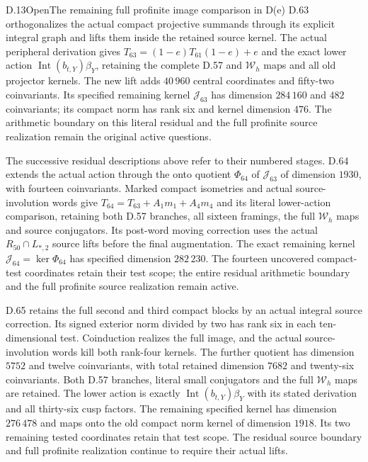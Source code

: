 \begin{statement}{D.13}{Open}{The remaining full profinite image comparison in D(e)}
D.63 orthogonalizes the actual compact projective summands
through its explicit integral graph and lifts them inside the
retained source kernel. The actual peripheral derivation gives
$T_{63}=(1-e)T_{61}(1-e)+e$ and the exact lower action
$\operatorname{Int}(b_{t,Y})\beta_Y$, retaining the complete
D.57 and $\mathcal W_h$ maps and all old projector kernels.
The new lift adds $40\,960$ central coordinates and fifty-two
coinvariants. Its specified remaining kernel $\mathcal J_{63}$
has dimension $284\,160$ and $482$ coinvariants; its compact
norm has rank six and kernel dimension $476$.
The arithmetic boundary on this literal residual and the
full profinite source realization remain the original active
questions.

The successive residual descriptions above refer to their
numbered stages. D.64 extends the actual action through the
onto quotient $\Phi_{64}$ of $\mathcal J_{63}$ of dimension
$1930$, with fourteen coinvariants. Marked compact isometries
and actual source-involution words give
$T_{64}=T_{63}+A_1m_1+A_4m_4$ and its literal lower-action
comparison, retaining both D.57 branches, all sixteen framings,
the full $\mathcal W_h$ maps and source conjugators.
Its post-word moving correction uses the actual
$R_{50}\cap L_{*,2}$ source lifts before the final augmentation.
The exact remaining kernel $\mathcal J_{64}=\ker\Phi_{64}$
has specified dimension $282\,230$.
The fourteen uncovered compact-test coordinates retain
their test scope; the entire residual arithmetic boundary
and the full profinite source realization remain active.

D.65 retains the full second and third compact blocks by an actual
integral source correction. Its signed exterior norm divided by two
has rank six in each ten-dimensional test. Coinduction realizes the
full image, and the actual source-involution words kill both rank-four
kernels. The further quotient has dimension $5752$ and twelve
coinvariants, with total retained dimension $7682$ and twenty-six
coinvariants. Both D.57 branches, literal small conjugators and the
full $\mathcal W_h$ maps are retained. The lower action is exactly
$\operatorname{Int}(b_{t,Y})\beta_Y$ with its stated derivation and
all thirty-six cusp factors. The remaining specified kernel has
dimension $276\,478$ and maps onto the old compact norm kernel of
dimension $1918$. Its two remaining tested coordinates retain that
test scope. The residual source boundary and full profinite
realization continue to require their actual lifts.
\end{statement}
